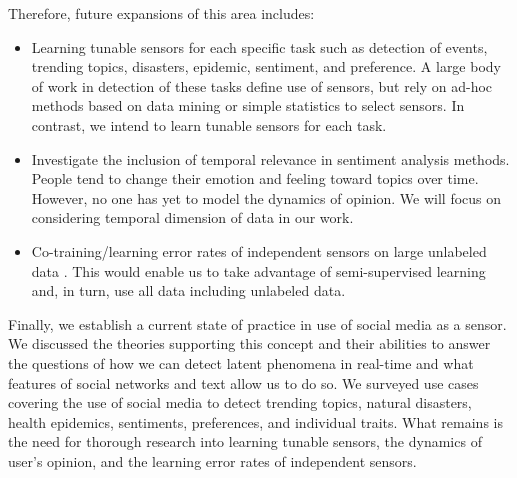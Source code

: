 \documentclass[11pt,a4paper]{article}
\begin{document}
Therefore, future expansions of this area includes:
\begin{itemize}
\item Learning tunable sensors for each specific task such as detection of events, trending topics, disasters, epidemic, sentiment, and preference. A large body of work in detection of these tasks define use of sensors, but rely on ad-hoc methods based on data mining or simple statistics to select sensors. In contrast, we intend to learn tunable sensors for each task.
\item Investigate the inclusion of temporal relevance in sentiment analysis methods. People tend to change their emotion and feeling toward topics over time. However, no one has yet to model the dynamics of opinion. We will focus on considering temporal dimension of data in our work.
\item Co-training/learning error rates of independent sensors on large unlabeled data \cite{platanios, blum}. This would enable us to take advantage of semi-supervised learning and, in turn, use all data including unlabeled data. %
\end{itemize}

Finally, we establish a current state of practice in use of social media as a sensor. We discussed the theories supporting this concept and their abilities to answer the questions of how we can detect latent phenomena in real-time and what features of social networks and text allow us to do so. We surveyed use cases covering the use of social media to detect trending topics, natural disasters, health epidemics, sentiments, preferences, and individual traits. What remains is the need for thorough research into learning tunable sensors, the dynamics of user's opinion, and the learning error rates of independent sensors.

 


% 
%
\end{document}

